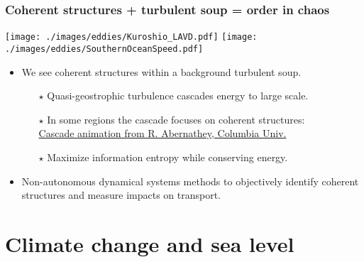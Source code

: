 \documentclass[10pt]{beamer}
\begin{document}
\begin{frame}
  \frametitle{Coherent structures + turbulent soup = order in chaos}

\begin{center}
\vspace{-.3cm}
{\texttt{[image: ./images/eddies/Kuroshio\_LAVD.pdf]}}
\hspace{1cm}
{\texttt{[image: ./images/eddies/SouthernOceanSpeed.pdf]}}
\vspace{-.3cm}

\end{center}

\begin{exampleblock}{}
\begin{itemize}
\item We see coherent structures within a background turbulent soup. 
\begin{itemize}
\item[$\star$] Quasi-geostrophic turbulence cascades energy to large
  scale.
\item[$\star$] In some regions the cascade focuses on coherent
  structures: \\  \href{https://vimeo.com/213705279}{Cascade animation from R. Abernathey, Columbia Univ.}
\item[$\star$] Maximize information entropy while conserving energy.

\end{itemize} 

 \item Non-autonomous dynamical systems methods to objectively
   identify coherent structures and measure impacts on transport.
\end{itemize}
\end{exampleblock}{}

\end{frame}



\section{Climate change and sea level}
\end{document}
